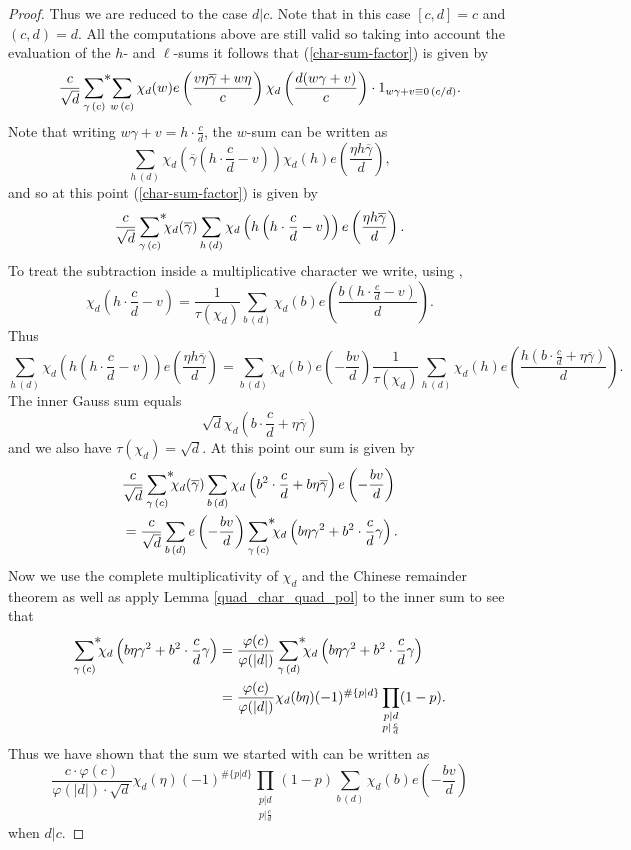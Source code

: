\documentclass[a4paper,10pt,twoside]{amsart}
\theoremstyle{definition}
\numberwithin{equation}{section}
\renewcommand\:{\colon}
\begin{document}
\begin{proof}
Thus we are reduced to the case $d|c$. Note that in this case $[c,d]=c$ and $(c,d)=d$. All the computations above are still valid so taking into account the evaluation of the $h$- and $\ell$-sums it follows that (\ref{char-sum-factor}) is given by 
\[ 
\frac c{\sqrt d}\mathop{{\sum}^{\makebox[0pt][l]{$*$}}}_{\gamma\,(c)}\,\sum_{w\,(c)}\chi_d(w)e\left(\frac{v\eta\overline\gamma+w\eta}c\right)\chi_d\left(\frac{d(w\gamma+v)}c \right)\cdot 1_{w\gamma+v\equiv 0\,(c/d)}.
\]
Note that writing $w\gamma+v=h\cdot\frac cd$, the $w$-sum can be written as
\[ 
\sum_{h\,(d)}\chi_d\left(\overline\gamma\left(h\cdot\frac cd-v\right)\right)\chi_d(h)e\left(\frac{\eta h\overline\gamma}d\right),
\]
and so at this point (\ref{char-sum-factor}) is given by 
\[ 
\frac c{\sqrt d}\mathop{{\sum}^{\makebox[0pt][l]{$*$}}}_{\gamma\,(c)}\chi_d(\overline\gamma)\sum_{h\,(d)}\chi_d\left(h\left(h\cdot\frac cd-v\right)\right)e\left(\frac{\eta h\overline\gamma}d\right).
\]
To treat the subtraction inside a multiplicative character we write, using \cite[(3.12)]{Iwaniec-Kowalski2004},
\[ 
\chi_d\left(h\cdot\frac cd-v\right)=\frac1{\tau(\chi_d)}\sum_{b\,(d)}\chi_d(b)e\left(\frac{b\left(h\cdot\frac cd-v\right)}d\right).
\]  
Thus
\[ 
\sum_{h\,(d)}\chi_d\left(h\left(h\cdot\frac cd-v\right)\right)e\left(\frac{\eta h\overline\gamma}d\right)=\sum_{b\,(d)}\chi_d(b)e\left(-\frac{bv}d\right)\frac1{\tau(\chi_d)}\sum_{h\,(d)}\chi_d(h)e\left(\frac{h\left(b\cdot\frac cd+\eta\overline\gamma\right)}d\right).
\]
The inner Gauss sum equals
\[ 
\sqrt d\chi_d\left(b\cdot\frac cd+\eta\overline\gamma\right)
\]
and we also have $\tau(\chi_d)=\sqrt d$. At this point our sum is given by 
\begin{align*} 
&\frac c{\sqrt d}\mathop{{\sum}^{\makebox[0pt][l]{$*$}}}_{\gamma\,(c)}\chi_d(\overline\gamma)\sum_{b\,(d)}\chi_d\left(b^2\cdot\frac cd+b\eta\overline\gamma\right)e\left(-\frac{bv}d\right)\\
&=\frac c{\sqrt d}\sum_{b\,(d)}e\left(-\frac{bv}d\right)\mathop{{\sum}^{\makebox[0pt][l]{$*$}}}_{\gamma\,(c)}\chi_d\left(b\eta\gamma^2+b^2\cdot\frac cd\gamma\right).
\end{align*}
Now we use the complete multiplicativity of $\chi_d$ and the Chinese remainder theorem as well as apply Lemma \ref{quad_char_quad_pol} to the inner sum to see that 
\begin{align*}
\mathop{{\sum}^{\makebox[0pt][l]{$*$}}}_{\gamma\,(c)}\chi_d\left(b\eta\gamma^2+b^2\cdot\frac cd\gamma\right)&=\frac{\varphi(c)}{\varphi(|d|)}\mathop{{\sum}^{\makebox[0pt][l]{$*$}}}_{\gamma\,(d)}\chi_d\left(b\eta\gamma^2+b^2\cdot\frac cd\gamma\right)\\
&=\frac{\varphi(c)}{\varphi(|d|)}\chi_d(b\eta)(-1)^{\#\{p|d\}}\prod_{\substack{p|d\\
p|\frac cd}}(1-p). 
\end{align*} 
Thus we have shown that the sum we started with can be written as 
\[ 
\frac{c\cdot\varphi(c)}{\varphi(|d|)\cdot \sqrt d}\chi_d(\eta)(-1)^{\#\{p|d\}}\prod_{\substack{p|d\\
p|\frac cd}}(1-p)\sum_{b\,(d)}\chi_d(b)e\left(-\frac{bv}d\right)
\]
when $d|c$.


\end{proof}
\end{document}
